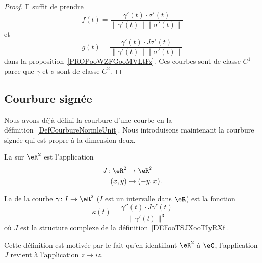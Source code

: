 \begin{proof}
	Il suffit de prendre
	\begin{equation}
		f(t)=\frac{ \gamma'(t)\cdot\sigma'(t) }{ \| \gamma'(t) \|\| \sigma'(t) \| }
	\end{equation}
	et
	\begin{equation}
		g(t)=\frac{ \gamma'(t)\cdot J\sigma'(t) }{ \| \gamma'(t) \|\| \sigma'(t) \| }
	\end{equation}
	dans la proposition~\ref{PROPooWZFGooMVLtFz}. Ces courbes sont de classe \( C^1\) parce que \( \gamma\) et \( \sigma\) sont de classe \( C^2\).
\end{proof}

\subsection{Courbure signée}

Nous avons déjà défini la courbure d'une courbe en la définition~\ref{DefCourbureNormleUnit}. Nous introduisons maintenant la courbure signée qui est propre à la dimension deux.

\begin{definition}      \label{DEFooTSJXooTIyRXf}
	La  sur \( \eR^2\) est l'application
	\begin{equation}
		\begin{aligned}
			J\colon \eR^2 & \to \eR^2       \\
			(x,y)         & \mapsto (-y,x).
		\end{aligned}
	\end{equation}
\end{definition}

\begin{definition}      \label{DEFooJFWEooXcIVUs}
	La  de la courbe \( \gamma\colon I\to \eR^2\) (\( I\) est un intervalle dans \( \eR\)) est la fonction
	\begin{equation}        \label{EQooWOUQooXrVzGx}
		\kappa(t)=\frac{ \gamma''(t)\cdot J\gamma'(t) }{ \| \gamma'(t) \|^3 }
	\end{equation}
	où \( J\) est la structure complexe de la définition~\ref{DEFooTSJXooTIyRXf}.
\end{definition}
Cette définition est motivée par le fait qu'en identifiant \( \eR^2\) à \( \eC\), l'application \( J\) revient à l'application \( z\mapsto iz\).

